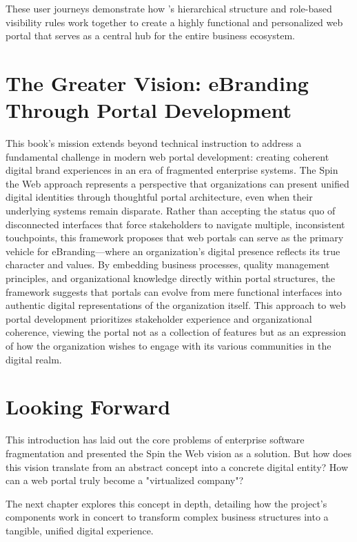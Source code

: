 These user journeys demonstrate how \wbdl{}'s hierarchical structure and role-based visibility rules work together to create a highly functional and personalized web portal that serves as a central hub for the entire business ecosystem.

\section{The Greater Vision: eBranding Through Portal Development}
\label{sec:ebranding-vision}

This book's mission extends beyond technical instruction to address a fundamental challenge in modern web portal development: creating coherent digital brand experiences in an era of fragmented enterprise systems. The Spin the Web approach represents a perspective that organizations can present unified digital identities through thoughtful portal architecture, even when their underlying systems remain disparate. Rather than accepting the status quo of disconnected interfaces that force stakeholders to navigate multiple, inconsistent touchpoints, this framework proposes that web portals can serve as the primary vehicle for eBranding—where an organization's digital presence reflects its true character and values. By embedding business processes, quality management principles, and organizational knowledge directly within portal structures, the framework suggests that portals can evolve from mere functional interfaces into authentic digital representations of the organization itself. This approach to web portal development prioritizes stakeholder experience and organizational coherence, viewing the portal not as a collection of features but as an expression of how the organization wishes to engage with its various communities in the digital realm.

\section{Looking Forward}
\label{sec:looking-forward}

This introduction has laid out the core problems of enterprise software fragmentation and presented the Spin the Web vision as a solution. But how does this vision translate from an abstract concept into a concrete digital entity? How can a web portal truly become a "virtualized company"?

The next chapter explores this concept in depth, detailing how the project's components work in concert to transform complex business structures into a tangible, unified digital experience.
